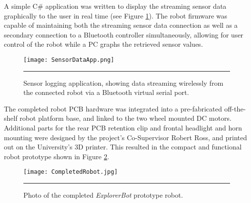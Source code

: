 

A simple C\# application was written to display the streaming sensor data graphically to the user in real time (see Figure \ref{fig:sensorhostapp}). The robot firmware was capable of maintaining both the streaming sensor data connection as well as a secondary connection to a Bluetooth controller simultaneously, allowing for user control of the robot while a PC graphs the retrieved sensor values.

\begin{figure}[tbph]
	\vspace{1em}
	\centering
		\texttt{[image: SensorDataApp.png]}
	\rule{35em}{0.5pt}
	\caption[Sensor Logging Host Application]{Sensor logging application, showing data streaming wirelessly from the connected robot via a Bluetooth virtual serial port.}
	\label{fig:sensorhostapp}
\end{figure}

The completed robot PCB hardware was integrated into a pre-fabricated off-the-shelf robot platform base, and linked to the two wheel mounted DC motors. Additional parts for the rear PCB retention clip and frontal headlight and horn mounting were designed by the project's Co-Supervisor Robert Ross, and printed out on the University's 3D printer. This resulted in the compact and functional robot prototype shown in Figure \ref{fig:completedrobot}.

\begin{figure}[tbph]
	\vspace{1em}
	\centering
		\texttt{[image: CompletedRobot.jpg]}
	\rule{35em}{0.5pt}
	\caption[Photo of Completed Robot]{Photo of the completed \textit{ExplorerBot} prototype robot.}
	\label{fig:completedrobot}
\end{figure}
